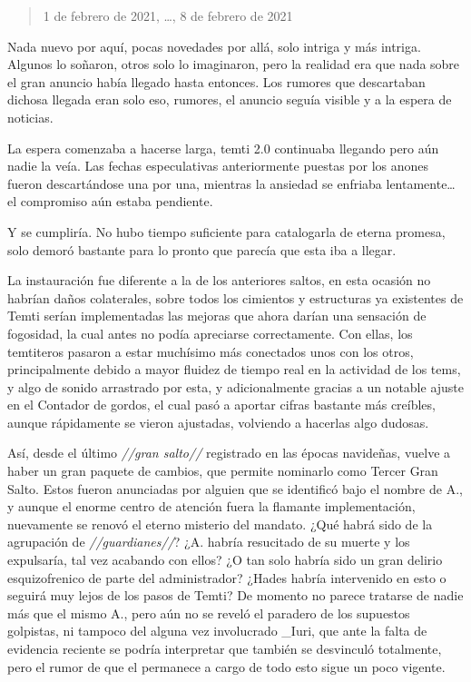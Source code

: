 \documentclass[
  spanish,
]{book}
\begin{document}
\begin{quote}
1 de febrero de 2021, \ldots, 8 de febrero de 2021
\end{quote}

Nada nuevo por aquí, pocas novedades por allá, solo intriga y más intriga.
Algunos lo soñaron, otros solo lo imaginaron, pero la realidad era que nada sobre el gran anuncio había llegado hasta entonces.
Los rumores que descartaban dichosa llegada eran solo eso, rumores, el anuncio seguía visible y a la espera de noticias.

La espera comenzaba a hacerse larga, temti 2.0 continuaba llegando pero aún nadie la veía.
Las fechas especulativas anteriormente puestas por los anones fueron descartándose una por una, mientras la ansiedad se enfriaba lentamente\ldots{} el compromiso aún estaba pendiente.

Y se cumpliría. No hubo tiempo suficiente para catalogarla de eterna promesa, solo demoró bastante para lo pronto que parecía que esta iba a llegar.

La instauración fue diferente a la de los anteriores saltos, en esta ocasión no habrían daños colaterales, sobre todos los cimientos y estructuras ya existentes de Temti serían implementadas las mejoras que ahora darían una sensación de fogosidad, la cual antes no podía apreciarse correctamente. Con ellas, los temtiteros pasaron a estar muchísimo más conectados unos con los otros, principalmente debido a mayor fluidez de tiempo real en la actividad de los tems, y algo de sonido arrastrado por esta, y adicionalmente gracias a un notable ajuste en el Contador de gordos, el cual pasó a aportar cifras bastante más creíbles, aunque rápidamente se vieron ajustadas, volviendo a hacerlas algo dudosas.

Así, desde el último \emph{//gran salto//} registrado en las épocas navideñas, vuelve a haber un gran paquete de cambios, que permite nominarlo como Tercer Gran Salto.
Estos fueron anunciadas por alguien que se identificó bajo el nombre de A., y aunque el enorme centro de atención fuera la flamante implementación, nuevamente se renovó el eterno misterio del mandato. ¿Qué habrá sido de la agrupación de \emph{//guardianes//}? ¿A. habría resucitado de su muerte y los expulsaría, tal vez acabando con ellos? ¿O tan solo habría sido un gran delirio esquizofrenico de parte del administrador? ¿Hades habría intervenido en esto o seguirá muy lejos de los pasos de Temti?
De momento no parece tratarse de nadie más que el mismo A., pero aún no se reveló el paradero de los supuestos golpistas, ni tampoco del alguna vez involucrado \_Iuri, que ante la falta de evidencia reciente se podría interpretar que también se desvinculó totalmente, pero el rumor de que el permanece a cargo de todo esto sigue un poco vigente.
\end{document}

